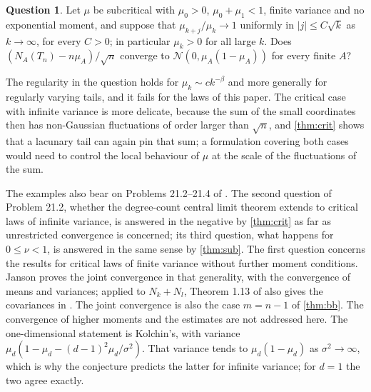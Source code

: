 \documentclass[11pt]{amsart}
\theoremstyle{definition}
\newtheorem{question}[theorem]{Question}
\newcommand{\Nor}{\mathcal{N}}
\begin{document}
\begin{question}
Let $\mu$ be subcritical with $\mu_0>0$, $\mu_0+\mu_1<1$, finite variance and no exponential moment, and suppose that $\mu_{k+j}/\mu_k\to1$ uniformly in $|j|\le C\sqrt k$ as $k\to\infty$, for every $C>0$; in particular $\mu_k>0$ for all large $k$. Does $(N_A(T_n)-n\mu_A)/\sqrt n$ converge to $\Nor(0,\mu_A(1-\mu_A))$ for every finite $A$?
\end{question}

The regularity in the question holds for $\mu_k\sim ck^{-\beta}$ and more generally for regularly varying tails, and it fails for the laws of this paper. The critical case with infinite variance is more delicate, because the sum of the small coordinates then has non-Gaussian fluctuations of order larger than $\sqrt n$, and \cref{thm:crit} shows that a lacunary tail can again pin that sum; a formulation covering both cases would need to control the local behaviour of $\mu$ at the scale of the fluctuations of the sum.

The examples also bear on Problems 21.2--21.4 of \cite{Janson12}. The second question of Problem 21.2, whether the degree-count central limit theorem extends to critical laws of infinite variance, is answered in the negative by \cref{thm:crit} as far as unrestricted convergence is concerned; its third question, what happens for $0\le\nu<1$, is answered in the same sense by \cref{thm:sub}. The first question concerns the results \cite[(21.7)--(21.9)]{Janson12} for critical laws of finite variance without further moment conditions. Janson \cite[Example 2.2]{Janson16} proves the joint convergence \cite[(21.7)]{Janson12} in that generality, with the convergence of means and variances; applied to $N_k+N_l$, Theorem 1.13 of \cite{Janson16} also gives the covariances in \cite[(21.8)]{Janson12}. The joint convergence is also the case $m=n-1$ of \cref{thm:bb}. The convergence of higher moments and the estimates \cite[(21.9)]{Janson12} are not addressed here. The one-dimensional statement is Kolchin's, with variance $\mu_d(1-\mu_d-(d-1)^2\mu_d/\sigma^2)$. That variance tends to $\mu_d(1-\mu_d)$ as $\sigma^2\to\infty$, which is why the conjecture predicts the latter for infinite variance; for $d=1$ the two agree exactly.
\end{document}
